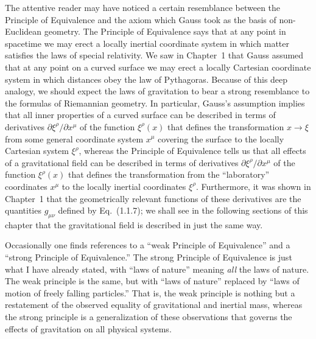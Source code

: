 The attentive reader may have noticed a certain resemblance between the
Principle of Equivalence and the axiom which Gauss took as the basis of
non-Euclidean geometry. The Principle of Equivalence says that at any point
in spacetime we may erect a locally inertial coordinate system in which
matter satisfies the laws of special relativity. We saw in Chapter~1 that
Gauss assumed that at any point on a curved surface we may erect a locally
Cartesian coordinate system in which distances obey the law of Pythagoras.
Because of this deep analogy, we should expect the laws of gravitation to
bear a strong resemblance to the formulas of Riemannian geometry. In
particular, Gauss's assumption implies that all inner properties of a curved
surface can be described in terms of derivatives
$\partial\xi^\rho/\partial x^\mu$ of the function $\xi^\rho(x)$ that defines
the transformation $x\to\xi$ from some general coordinate system $x^\mu$
covering the surface to the locally Cartesian system $\xi^\rho$, whereas the
Principle of Equivalence tells us that all effects of a gravitational field
can be described in terms of derivatives
$\partial\xi^\rho/\partial x^\mu$ of the function $\xi^\rho(x)$ that defines
the transformation from the ``laboratory'' coordinates $x^\mu$ to the
locally inertial coordinates $\xi^\rho$. Furthermore, it was shown in
Chapter~1 that the geometrically relevant functions of these derivatives are
the quantities $g_{\mu\nu}$ defined by Eq.~(1.1.7); we shall see in the
following sections of this chapter that the gravitational field is described
in just the same way.

Occasionally one finds references to a ``weak Principle of Equivalence'' and
a ``strong Principle of Equivalence.'' The strong Principle of Equivalence is
just what I have already stated, with ``laws of nature'' meaning \emph{all}
the laws of nature. The weak principle is the same, but with ``laws of
nature'' replaced by ``laws of motion of freely falling particles.'' That is,
the weak principle is nothing but a restatement of the observed equality of
gravitational and inertial mass, whereas the strong principle is a
generalization of these observations that governs the effects of gravitation
on all physical systems.

